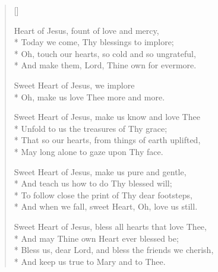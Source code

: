 \newHymn

\settowidth{\versewidth}{Sweet Heart of Jesus, fount of love and mercy}

\begin{verse}[\versewidth]

 Heart of Jesus, fount of love and mercy,\\*
Today we come, Thy blessings to implore;\\*
Oh, touch our hearts, so cold and so ungrateful,\\*
And make them, Lord, Thine own for evermore.

\begin{indentedVerse}
\vin Sweet Heart of Jesus, we implore\\*
\vin Oh, make us love Thee more and more.
\end{indentedVerse}

Sweet Heart of Jesus, make us know and love Thee\\*
Unfold to us the treasures of Thy grace;\\*
That so our hearts, from things of earth uplifted,\\*
May long alone to gaze upon Thy face.

Sweet Heart of Jesus, make us pure and gentle,\\*
And teach us how to do Thy blessed will;\\*
To follow close the print of Thy dear footsteps,\\*
And when we fall, sweet Heart, Oh, love us still.

Sweet Heart of Jesus, bless all hearts that love Thee,\\*
And may Thine own Heart ever blessed be;\\*
Bless us, dear Lord, and bless the friends we cherish,\\*
And keep us true to Mary and to Thee.

\end{verse}

